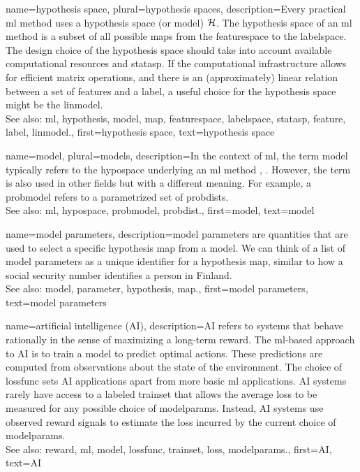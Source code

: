 {name={hypothesis space}, plural={hypothesis spaces}, 
	description={Every 
		practical \gls{ml} method uses a \gls{hypothesis} space (or \gls{model}) $\mathcal{H}$. The \gls{hypothesis} space 
		of an \gls{ml} method is a subset of all possible \glspl{map} from the \gls{featurespace} to the \gls{labelspace}. 
		The design choice of the \gls{hypothesis} space should take into account available computational resources and 
		\gls{statasp}. If the computational infrastructure allows for efficient matrix operations, and there 
		is an (approximately) linear relation between a set of \glspl{feature} and a \gls{label}, a useful choice for the 
		\gls{hypothesis} space might be the \gls{linmodel}.
				\\
		See also: \gls{ml}, \gls{hypothesis}, \gls{model}, \gls{map}, \gls{featurespace}, \gls{labelspace}, \gls{statasp}, \gls{feature}, \gls{label}, \gls{linmodel}.},
	first={hypothesis space},
	text={hypothesis space} 
}

	
{name={model}, plural={models}, 
	description={In the context of \gls{ml}, 
		the term model typically refers to the \gls{hypospace} underlying an 
		\gls{ml} method \cite{MLBasics}, \cite{ShalevMLBook}. However, the term is also used in other 
		fields but with a different meaning. For example, a \gls{probmodel} refers to a parametrized 
		set of \glspl{probdist}.
				\\
		See also: \gls{ml}, \gls{hypospace}, \gls{probmodel}, \gls{probdist}.},
	first={model},
	text={model} 
}

{name={model parameters}, 
	description={\Gls{model} \glspl{parameter} are quantities that 
		are used to select a specific \gls{hypothesis} \gls{map} from a \gls{model}. 
		We can think of a list of \gls{model} \glspl{parameter} as a unique identifier for a \gls{hypothesis} 
		\gls{map}, similar to how a social security number identifies a person in Finland.
			\\
		See also: \gls{model}, \gls{parameter}, \gls{hypothesis}, \gls{map}.},
	first={model parameters},
	text={model parameters} 
}

{name={artificial intelligence (AI)}, 
	description={AI refers to systems that behave rationally in the sense of 
		maximizing a long-term \gls{reward}. The \gls{ml}-based approach to AI is to train a \gls{model} to   
		predict optimal actions. These \glspl{prediction} are computed from observations about the state of the 
		environment. The choice of \gls{lossfunc} sets AI applications apart from more basic \gls{ml} applications. 
		AI systems rarely have access to a labeled \gls{trainset} that allows the average \gls{loss} to be 
		measured for any possible choice of \gls{modelparams}. Instead, AI systems use observed \gls{reward} 
		signals to estimate the \gls{loss} incurred by the current choice of \gls{modelparams}.
				\\
		See also: \gls{reward}, \gls{ml}, \gls{model}, \gls{lossfunc}, \gls{trainset}, \gls{loss}, \gls{modelparams}.},
	first={AI},
	text={AI} 
}


